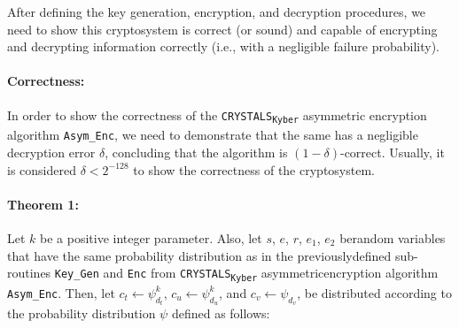 \documentclass[runningheads]{llncs}
\numberwithin{equation}{section}
\begin{document}
    \vspace{1ex}

    \noindent After defining the key generation, encryption, and decryption procedures, we need to show this cryptosystem is correct (or sound) and capable of encrypting and decrypting information correctly (i.e., with a negligible failure probability).

    \vspace{-1ex}
    \paragraph{\textbf{Correctness:}} In order to show the correctness of the \texorpdfstring{\texttt{CRYSTALS}\textsubscript{\texttt{Kyber}}}\/ asymmetric encryption algorithm \texttt{Asym\_Enc}, we need to demonstrate that the same has a negligible decryption error $\delta$, concluding that the algorithm is $(1 - \delta)$-correct. Usually, it is considered $\delta < {2}^{-128}$ to show the correctness of the cryptosystem.

    \clearpage
    
    \paragraph{\textbf{Theorem 1:}} Let $k$ be a positive integer parameter. Also, let $s$, $e$, $r$, ${e}_{1}$, ${e}_{2}$ be\break random variables that have the same probability distribution as in the previously\break defined sub-routines \texttt{Key\_Gen} and \texttt{Enc} from \texorpdfstring{\texttt{CRYSTALS}\textsubscript{\texttt{Kyber}}}\/ asymmetric\break encryption algorithm \texttt{Asym\_Enc}. Then, let ${c}_{t} \gets {\psi}_{{d}_{t}}^{k}$, ${c}_{u} \gets {\psi}_{{d}_{u}}^{k}$, and ${c}_{v} \gets {\psi}_{{d}_{v}}$, be distributed according to the probability distribution $\psi$ defined as follows:
\end{document}
